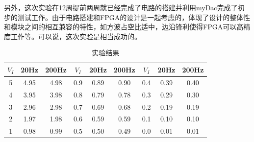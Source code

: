 \documentclass[UTF8,a4paper]{paper}
\begin{document}
另外，这次实验在12周提前两周就已经完成了电路的搭建并利用myDac完成了初步的测试工作。由于电路搭建和FPGA的设计是一起考虑的，体现了设计的整体性和模块之间的相互兼容的特性，如方波占空比适中，边沿锋利使得FPGA可以高精度工作等。可以说，这次实验是相当成功的。

\begin{table}[h]
\centering
\caption{实验结果}
\label{t1}
\begin{tabular}{|c|c|c|c|c|c|c|c|c|}
\hline
$V_{I}$ & 20Hz & 200Hz&$V_{I}$ & 20Hz & 200Hz&$V_{I}$ & 20Hz & 200Hz\\ \hline
5 & 4.95 & 4.98 & 0.9 & 0.89 & 0.90 &0.4 & 0.39 & 0.40\\ \hline
4 & 3.95 & 3.98 & 0.8 & 0.79 & 0.78 &0.3 & 0.29 & 0.30\\ \hline
3 & 2.96 & 2.98 & 0.7 & 0.69 & 0.68 & 0.2 & 0.19 & 0.19 \\ \hline
2 & 1.97 & 1.98 & 0.6 & 0.59 & 0.59 & 0.1 & 0.10 & 0.10\\ \hline
1 & 0.98 & 0.99 & 0.5 & 0.50 & 0.49 &0.0 & 0.01 & 0.01\\ \hline
\end{tabular}
\end{table}
\end{document}
